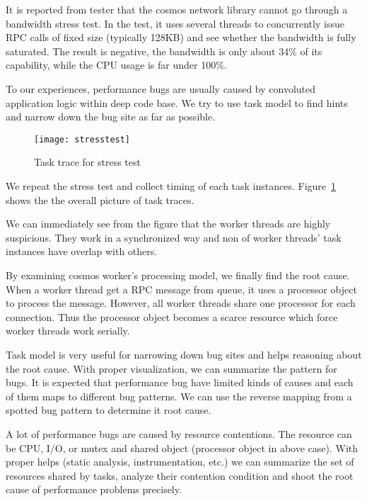 It is reported from tester that the cosmos network library
cannot go through a bandwidth stress test. In the test,
it uses several threads to concurrently issue RPC calls of
fixed size (typically 128KB) and see whether the bandwidth
is fully saturated. The result is negative, the bandwidth is
only about 34\% of its capability, while the CPU usage is
far under 100\%.

To our experiences, performance bugs are usually caused by
convoluted application logic within deep code base. We try
to use task model to find hints and narrow down the bug site
as far as possible.

\begin{figure}
\centering
\texttt{[image: stresstest]}
\caption{Task trace for stress test}
\label{fig:stresstest}
\end{figure}

We repeat the stress test and collect timing of each task
instances. Figure~\ref{fig:stresstest} shows the the overall
picture of task traces.

We can immediately see from the figure that the worker
threads are highly suspicious. They work in a synchronized
way and non of worker threads' task instances have overlap
with others.

By examining cosmos worker's processing model, we finally
find the root cause. When a worker thread get a RPC message
from queue, it uses a processor object to process the
message. However, all worker threads share one processor for
each connection. Thus the processor object becomes a scarce
resource which force worker threads work serially.

\lesson Task model is very useful for narrowing down bug
sites and helps reasoning about the root cause. With proper
visualization, we can summarize the pattern for bugs. It is
expected that performance bug have limited kinds of causes
and each of them maps to different bug patterns. We can use
the reverse mapping from a spotted bug pattern to determine
it root cause.

A lot of performance bugs are caused by resource
contentions. The resource can be CPU, I/O, or mutex and
shared object (processor object in above case). With proper
helps (static analysis, instrumentation, etc.) we can
summarize the set of resources shared by tasks, analyze
their contention condition and shoot the root cause of
performance problems precisely.

